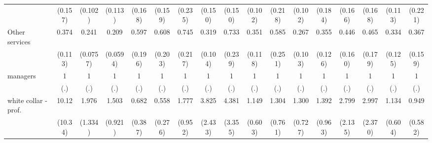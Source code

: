 {\begin{tabular}{l*{16}{c}}
                    &     (0.157)         &     (0.102)         &     (0.113)         &     (0.168)         &     (0.159)         &     (0.235)         &     (0.150)         &     (0.150)         &     (0.102)         &     (0.218)         &     (0.102)         &     (0.184)         &     (0.166)         &     (0.168)         &     (0.113)         &     (0.221)         \\
[1em]
Other services      &       0.374\sym{**} &       0.241\sym{***}&       0.209\sym{***}&       0.597         &       0.608         &       0.745         &       0.319\sym{***}&       0.733         &       0.351\sym{**} &       0.585         &       0.267\sym{***}&       0.355\sym{**} &       0.446\sym{*}  &       0.465\sym{*}  &       0.334\sym{**} &       0.367\sym{*}  \\
                    &     (0.113)         &    (0.0757)         &    (0.0594)         &     (0.196)         &     (0.203)         &     (0.217)         &     (0.104)         &     (0.239)         &     (0.118)         &     (0.251)         &     (0.103)         &     (0.126)         &     (0.160)         &     (0.179)         &     (0.125)         &     (0.159)         \\
[1em]
managers            &           1         &           1         &           1         &           1         &           1         &           1         &           1         &           1         &           1         &           1         &           1         &           1         &           1         &           1         &           1         &           1         \\
                    &         (.)         &         (.)         &         (.)         &         (.)         &         (.)         &         (.)         &         (.)         &         (.)         &         (.)         &         (.)         &         (.)         &         (.)         &         (.)         &         (.)         &         (.)         &         (.)         \\
[1em]
white collar - prof.&       10.12\sym{*}  &       1.976         &       1.503         &       0.682         &       0.558         &       1.777         &       3.825\sym{*}  &       4.381         &       1.149         &       1.304         &       1.300         &       1.392         &       2.799         &       2.997         &       1.134         &       0.949         \\
                    &     (10.34)         &     (1.334)         &     (0.921)         &     (0.387)         &     (0.276)         &     (0.952)         &     (2.433)         &     (3.355)         &     (0.603)         &     (0.761)         &     (0.727)         &     (0.963)         &     (2.135)         &     (2.370)         &     (0.604)         &     (0.582)         \\

\end{tabular}}
